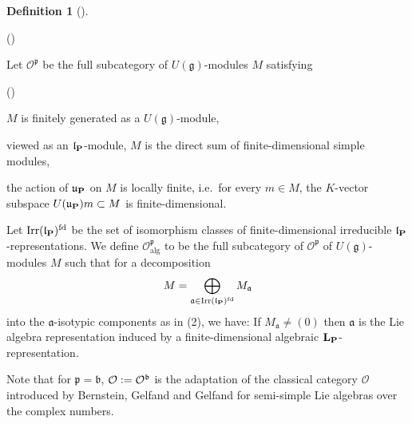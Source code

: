 \documentclass[a4paper, reqno, 10pt]{amsart}
\theoremstyle{definition}
\newtheorem{definition}[theorem]{Definition}
\newenvironment{altenumerate}
	{\begin{list}
		{\textup{(\theenumi)} }
		{\usecounter{enumi}
			\setlength{\labelwidth}{0pt}
			\setlength{\labelsep}{0pt}
			\setlength{\leftmargin}{0pt}
			\setlength{\itemsep}{0pt}
			\setlength{\topsep}{0pt}
		\renewcommand{\theenumi}{\roman{enumi}}
		}}
	{\end{list}}
\newenvironment{altenumeratelevel2}
{\begin{list}
		{\textup{(\theenumi)} }
		{\usecounter{enumii}
			\setlength{\labelwidth}{2em}
			\setlength{\labelsep}{0pt}
			\setlength{\leftmargin}{2em}
			\setlength{\itemsep}{2pt}
			\setlength{\topsep}{2pt}
			\setlength{\itemindent}{0pt}
			\renewcommand{\theenumi}{\arabic{enumii}}
	}}
	{\end{list}}
\numberwithin{equation}{section}
\newcommand{\defeq}{\vcentcolon=}
\newcommand{\CO}{{\mathcal {O}}}
\newcommand{\bL}{{\mathrm{\bf L}}}
\newcommand{\bP}{{\mathrm{\bf P}}}
\newcommand{\Fa}{{\mathfrak {a}}}
\newcommand{\Fb}{{\mathfrak {b}}}
\newcommand{\Fg}{{\mathfrak {g}}}
\newcommand{\Fl}{{\mathfrak {l}}}
\newcommand{\Fp}{{\mathfrak {p}}}
\newcommand{\Fu}{{\mathfrak {u}}}
\newcommand{\alg}{{\mathrm{alg}}}
\begin{document}
\begin{definition}[{\cite[\S 2.5]{OrlikStrauch15JordanHoelderSerLocAnRep}}]
	\begin{altenumerate}
		\item
		Let $\CO^\Fp$ be the full subcategory of $U(\Fg)$-modules $M$ satisfying
		\begin{altenumeratelevel2}
			\item 
			$M$ is finitely generated as a $U(\Fg)$-module,
			\item
			viewed as an $\Fl_\bP$-module, $M$ is the direct sum of finite-dimensional simple modules,
			\item
			the action of $\Fu_\bP$ on $M$ is locally finite, i.e.\ for every $m\in M$, the $K$-vector subspace $U(\Fu_\bP) m \subset M$ is finite-dimensional.
		\end{altenumeratelevel2}
		\item
		Let ${\rm Irr}(\Fl_\bP)^{\rm fd}$ be the set of isomorphism classes of finite-dimensional irreducible $\Fl_\bP$-re\-pre\-sen\-tations.
		We define $\CO_\alg^\Fp$ to be the full subcategory of $\CO^\Fp$ of $U(\Fg)$-modules $M$ such that for a decomposition 
		\[ M = \bigoplus_{\Fa \in {\rm Irr}(\Fl_\bP)^{\rm fd}} M_\Fa \]
		into the $\Fa$-isotypic components as in (2), we have: If $M_\Fa \neq (0)$ then $\Fa$ is the Lie algebra representation induced by a finite-dimensional algebraic $\bL_\bP$-representation.
	\end{altenumerate}
\end{definition}


Note that for $\Fp = \Fb$, $\CO \defeq \CO^\Fb$ is the adaptation of the classical category $\CO$ introduced by Bernstein, Gelfand and Gelfand for semi-simple Lie algebras over the complex numbers.
\end{document}
